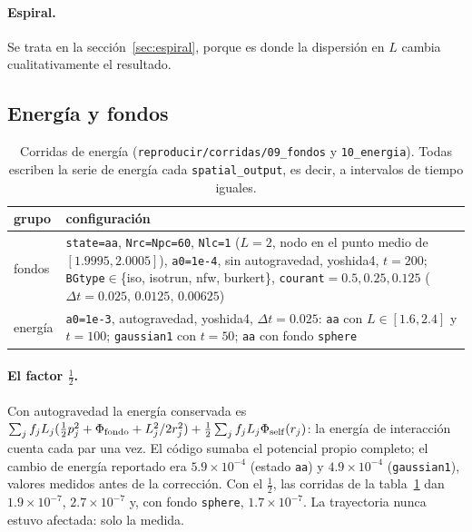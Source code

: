 \documentclass[11pt,a4paper]{article}
\begin{document}
\paragraph{Espiral.} Se trata en la sección~\ref{sec:espiral}, porque es donde la
dispersión en $L$ cambia cualitativamente el resultado.

\subsection{Energía y fondos}

\begin{table}[ht]
\centering
\small
\caption{Corridas de energía (\texttt{reproducir/corridas/09\_fondos} y
\texttt{10\_energia}). Todas escriben la serie de energía cada \texttt{spatial\_output},
es decir, a intervalos de tiempo iguales.}
\label{tab:energia}
\begin{tabular}{p{}p{}}
\toprule
grupo & configuración \\
\midrule
fondos & \texttt{state=aa}, \texttt{Nrc=Npc=60}, \texttt{Nlc=1} ($L=2$, nodo en el punto medio de $[1.9995,2.0005]$), \texttt{a0=1e-4}, sin autogravedad, yoshida4, $t=200$; \texttt{BGtype}$\in$\{iso, isotrun, nfw, burkert\}, \texttt{courant}$=0.5,0.25,0.125$ ($\Delta t=0.025$, $0.0125$, $0.00625$) \\
energía & \texttt{a0=1e-3}, autogravedad, yoshida4, $\Delta t=0.025$: \texttt{aa} con $L\in[1.6,2.4]$ y $t=100$; \texttt{gaussian1} con $t=50$; \texttt{aa} con fondo \texttt{sphere} \\
\bottomrule
\end{tabular}
\end{table}

\paragraph{El factor $\tfrac12$.} Con autogravedad la energía conservada es
$\sum_jf_jL_j(\tfrac12p_j^2+\Phi_{\rm fondo}+L_j^2/2r_j^2)+\tfrac12\sum_jf_jL_j\Phi_{\rm
self}(r_j)$: la energía de interacción cuenta cada par una vez. El código sumaba el
potencial propio completo; el cambio de energía reportado era $5.9\times10^{-4}$ (estado
\texttt{aa}) y $4.9\times10^{-4}$ (\texttt{gaussian1}), valores medidos antes de la
corrección. Con el $\tfrac12$, las corridas de la tabla~\ref{tab:energia} dan
$1.9\times10^{-7}$, $2.7\times10^{-7}$ y, con fondo \texttt{sphere}, $1.7\times10^{-7}$. La
trayectoria nunca estuvo afectada: solo la medida.
\end{document}
